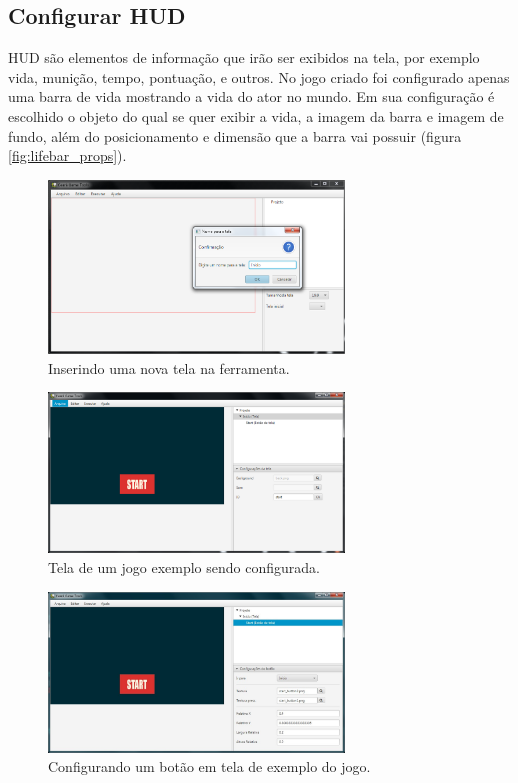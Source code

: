 \documentclass[12pt,oneside,openright,a4paper,english,brazil,sumario=tradicional]{abntex2}
\begin{document}
\begin{anexosenv}
   \section{Configurar HUD}
   HUD são elementos de informação que irão ser exibidos na tela, por exemplo vida, munição, tempo, pontuação, e outros. No jogo criado foi configurado apenas uma barra de vida mostrando a vida do ator no mundo. Em sua configuração é escolhido o objeto do qual se quer exibir a vida, a imagem da barra e imagem de fundo, além do posicionamento e dimensão que a barra vai possuir (figura \ref{fig:lifebar_props}).

   \begin{figure}[H]
   \centering
   \includegraphics[width=0.7\textwidth]{images/add_tela.png}
   \caption{Inserindo uma nova tela na ferramenta.}
   \label{fig:add_tela}
   \end{figure}

   \begin{figure}[H]
   \centering
   \includegraphics[width=0.7\textwidth]{images/add_tela_2.png}
   \caption{Tela de um jogo exemplo sendo configurada.}
   \label{fig:add_tela_2}
   \end{figure}

   \begin{figure}[H]
   \centering
   \includegraphics[width=0.7\textwidth]{images/add_botao.jpg}
   \caption{Configurando um botão em tela de exemplo do jogo.}
   \label{fig:add_botao}
   \end{figure}


\end{anexosenv}
\end{document}
